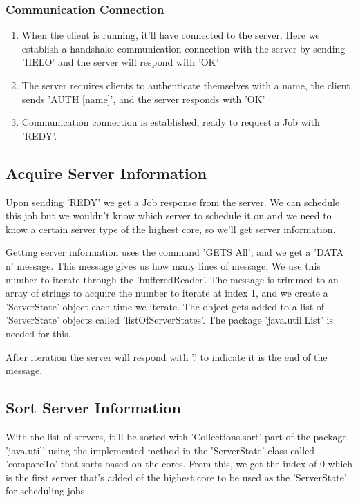 \documentclass[a4paper]{article} %
\begin{document}
\subsubsection{Communication Connection}
\begin{enumerate}
    \item When the client is running, it'll have connected to the server. Here we establish a handshake communication connection with the server by sending 'HELO' and the server will respond with 'OK'
    \item The server requires clients to authenticate themselves with a name, the client sends 'AUTH [name]', and the server responds with 'OK'
    \item Communication connection is established, ready to request a Job with 'REDY'.
\end{enumerate}

\subsection{Acquire Server Information}
Upon sending 'REDY' we get a Job response from the server. We can schedule this job but we wouldn't know which server to schedule it on and we need to know a certain server type of the highest core, so we'll get server information.

\medskip
Getting server information uses the command 'GETS All', and we get a 'DATA n' message. This message gives us how many lines of message. We use this number to iterate through the 'bufferedReader'. The message is trimmed to an array of strings to acquire the number to iterate at index 1, and we create a 'ServerState' object each time we iterate. The object gets added to a list of 'ServerState' objects called 'listOfServerStates'. The package 'java.util.List' is needed for this.

\medskip
After iteration the server will respond with '.' to indicate it is the end of the message.

\subsection{Sort Server Information}
With the list of servers, it'll be sorted with 'Collections.sort' part of the package 'java.util' using the implemented method in the 'ServerState' class called 'compareTo' that sorts based on the cores. From this, we get the index of 0 which is the first server that's added of the highest core to be used as the 'ServerState' for scheduling jobs
\end{document}
